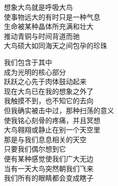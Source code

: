 \documentclass{article}
\begin{document}
想象大鸟就是呼吸大鸟\\
使事物远大的有时只是一种气息\\
生命被某种晶体所充满和壮大\\
推动青铜与时间背道而驰\\
大鸟硕大如同海天之间包孕的珍珠\\
\newpage

我们包含于其中\\
成为光明的核心部分\\
跃跃之心先于肉体鼓动起来\\
现在大鸟已在我的想象之外了\\
我触摸不到，也不知它的去向\\
但我确实被击中过，那种扫荡的意义\\
使我铭心刻骨的疼痛，并且冥想\\
大鸟翱翔或静止在别一个天空里\\
那是与我们息息相关的天空\\
只要我们偶尔想到它\\
便有某种感觉使我们广大无边 \\ 


当有一天大鸟突然朝我们飞来\\
我们所有的眼睛都会变成瞎子
\end{document}
